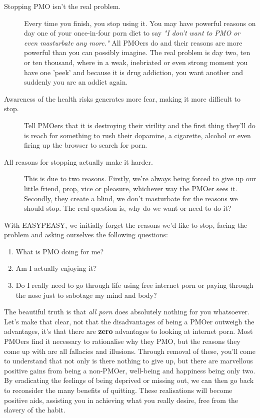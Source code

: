 \documentclass[easypeasy.tex]{subfiles}
\begin{document}
\begin{description}
  \item [Stopping PMO isn't the real problem.] Every time you finish, you stop using it. You may have powerful reasons on day one of your once-in-four porn diet to say \textit{"I don't want to PMO or even masturbate any more."} All PMOers do and their reasons are more powerful than you can possibly imagine. The real problem is day two, ten or ten thousand, where in a weak, inebriated or even strong moment you have one 'peek' and because it is drug addiction, you want another and suddenly you are an addict again.

\item [Awareness of the health risks generates more fear, making it more difficult to stop.] Tell PMOers that it is destroying their virility and the first thing they'll do is reach for something to rush their dopamine, a cigarette, alcohol or even firing up the browser to search for porn.

\item [All reasons for stopping actually make it harder.] This is due to two reasons. Firstly, we're always being forced to give up our little friend, prop, vice or pleasure, whichever way the PMOer sees it. Secondly, they create a blind, we don't masturbate for the reasons we should stop. The real question is, why do we want or need to do it?
\end{description}

With EASYPEASY, we initially forget the reasons we'd like to stop, facing the problem and asking ourselves the following questions:

\begin{enumerate}
\item What is PMO doing for me?
\item Am I actually enjoying it?
\item Do I really need to go through life using free internet porn or paying through the nose just to sabotage my mind and body?
\end{enumerate}

The beautiful truth is that \textit{all porn} does absolutely nothing for you whatsoever. Let's make that clear, not that the disadvantages of being a PMOer outweigh the advantages, it's that there are \textbf{zero} advantages to looking at internet porn. Most PMOers find it necessary to rationalise why they PMO, but the reasons they come up with are all fallacies and illusions. Through removal of these, you'll come to understand that not only is there nothing to give up, but there are marvellous positive gains from being a non-PMOer, well-being and happiness being only two. By eradicating the feelings of being deprived or missing out, we can then go back to reconsider the many benefits of quitting. These realisations will become positive aids, assisting you in achieving what you really desire, free from the slavery of the habit.
\end{document}
